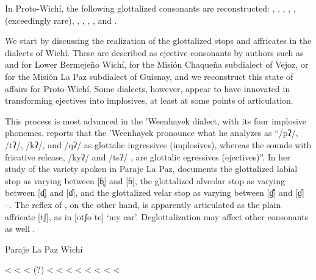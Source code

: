 In Proto-Wichí, the following glottalized consonants are reconstructed: , , , , ,  (exceedingly rare), , , , , and .

We start by discussing the realization of the glottalized stops and affricates in the dialects of Wichí. These are described as ejective consonants by authors such as \citet[128--131]{MC09} and \citet[49--51, 79--82]{VN14} for Lower Bermejeño Wichí, \citet{VU74} for the Misión Chaqueña subdialect of Vejoz, or \citet{MA08} for the Misión La Paz subdialect of Guisnay, and we reconstruct this state of affairs for Proto-Wichí. Some dialects, however, appear to have innovated in transforming ejectives into implosives, at least at some points of articulation.

This process is most advanced in the ’Weenhayek dialect, with its four implosive phonemes. \citet[29]{KC94} reports that the ’Weenhayek pronounce what he analyzes as ``/pʔ/, /tʔ/, /kʔ/, and /qʔ/ as glottalic ingressives (implosives), whereas the sounds with fricative release, /kyʔ/ and /tsʔ/ , are glottalic egressives (ejectives)''. In her study of the variety spoken in Paraje La Paz, \citet{AFG067} documents the glottalized labial stop as varying between [ɓ̥] and [ɓ], the glottalized alveolar stop as varying between [ɗ̥] and [ɗ], and the glottalized velar stop as varying between [ɠ̊] and [ɠ] –. The reflex of , on the other hand, is apparently articulated as the plain affricate [tʃ], as in [otʃoˈte] `my ear'. Deglottalization may affect other consonants as well .

\ea
Paraje La Paz Wichí \citep{AFG067}\\
    \begin{xlist}
        \ex {} <  \label{plp-deg-bo}
        \ex {} < 
        \ex {} \recind {} < (?) 
        \ex {} < 
        \ex {} < 
        \ex {} \recind {} < 
        \ex {} \recind {} < 
        \ex {} < 
        \ex {} < 
        \ex {} \recind {} <  \label{plp-deg-guse}
        \ex {} \recind {} < \label{plp-deg-laqe}
    \end{xlist}
\z
{}

